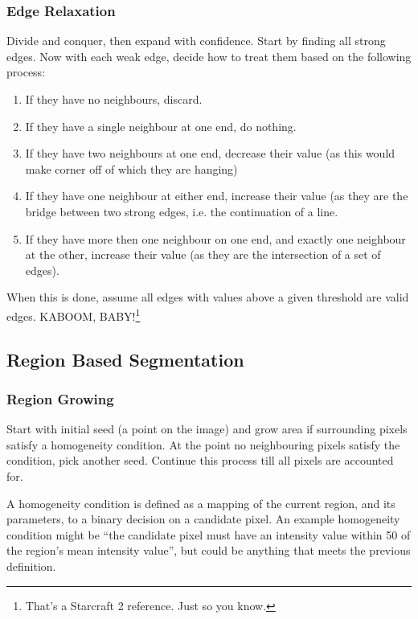 \documentclass{article}
\begin{document}
        \subsubsection{Edge Relaxation}
            Divide and conquer, then expand with confidence. Start by finding all strong edges. Now with each weak edge, decide how to treat them based on the following process:
            \begin{enumerate}
                \item If they have no neighbours, discard.
                \item If they have a single neighbour at one end, do nothing.
                \item If they have two neighbours at one end, decrease their value (as this would make corner off of which they are hanging)
                \item If they have one neighbour at either end, increase their value (as they are the bridge between two strong edges, i.e. the continuation of a line.
                \item If they have more then one neighbour on one end, and exactly one neighbour at the other, increase their value (as they are the intersection of a set of edges).
            \end{enumerate}
        
        When this is done, assume all edges with values above a given threshold are valid edges. KABOOM, BABY!\footnote{That's a Starcraft 2 reference. Just so you know.}
    \subsection{Region Based Segmentation}
        \subsubsection{Region Growing}
            Start with initial seed (a point on the image) and grow area if surrounding pixels satisfy a homogeneity condition. At the point no neighbouring pixels satisfy the condition, pick another seed. Continue this process till all pixels are accounted for.
            
            A homogeneity condition is defined as a mapping of the current region, and its parameters, to a binary decision on a candidate pixel. An example homogeneity condition might be ``the candidate pixel must have an intensity value within 50
            of the region's mean intensity value'', but could be anything that meets the previous definition.
            
\end{document}
